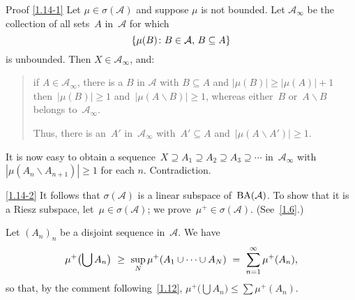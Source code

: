 \documentclass[main.tex]{subfiles}
\begin{document}
\begin{psec*}{Proof}
\ref{1.14-1} Let $\mu\in\sigma(\mathcal A)$
and suppose $\mu$ is not bounded.
Let $\mathcal{A}_\infty$ be
the collection of all sets~$A$ in~$\mathcal A$ for which
\begin{equation*}
\{ \mu(B)\colon B\in \mathcal A\text{, }B\subseteq A \}
\end{equation*} 
is unbounded.  
Then $X\in\mathcal{A}_\infty$, and:

\begin{quote}
if $A\in \mathcal{A}_\infty$,
there is a $B$ in $\mathcal A$ with $B\subseteq A$
and $|\mu(B)|\geq |\mu(A)|+1$
then~$|\mu(B)|\geq 1$
and~$|\mu(A\backslash B)|\ge 1$,
whereas either~$B$ or~$A\backslash B$
belongs to~$\mathcal{A}_\infty$.

Thus, there is an~$A'$ in~$\mathcal{A}_\infty$ with~$A'\subseteq A$
and~$|\mu(A\backslash A')|\ge 1$.
\end{quote}

It is now easy to obtain a 
sequence~$X\supseteq A_1\supseteq A_2\supseteq A_3 \supseteq \dotsb$
in~$\mathcal{A}_\infty$ 
with~$|\mu(A_n\backslash A_{n+1})|\geq 1$ for each $n$.
Contradiction.

\ref{1.14-2} 
It follows that $\sigma(\mathcal{A})$ 
is a linear subspace of~$\mathrm{BA}(\mathcal A)$.
To show that it is a Riesz subspace,
let~$\mu\in\sigma(\mathcal A)$;
we prove~$\mu^+\in\sigma(\mathcal A)$. (See~\ref{1.6}.)

Let $(A_n)_n$ be a disjoint sequence in~$\mathcal A$.
We have
\begin{equation*}
\mu^+ \bigl( \bigcup A_n \bigr)
   \ \geq\  \sup_N  \mu^+(A_1 \cup \dotsb \cup A_N) 
   \ =\  \sum_{n=1}^\infty \mu^+(A_n)
\text{,}
\end{equation*}
so that, 
by the comment following~\ref{1.12},
$\mu^+\bigl(\bigcup A_n\bigr) \leq \sum\mu^+(A_n)$.
\xqed
\end{psec*}
\clearpage
\end{document}
